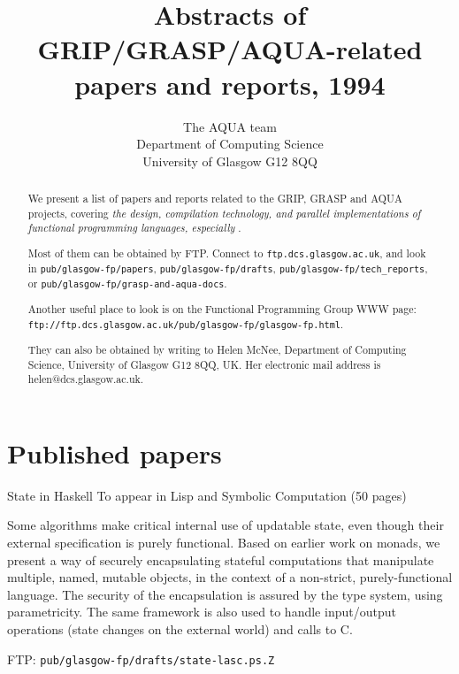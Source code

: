 



\title{Abstracts of GRIP/GRASP/AQUA-related papers and reports, 1994
}

\author{The AQUA team \\ Department of Computing Science \\
University of Glasgow G12 8QQ
}

\maketitle

\begin{abstract}
We present a list of papers and reports related to the GRIP, GRASP and AQUA projects,
covering {\em the design, compilation technology,
and parallel implementations of functional programming languages, especially
\Haskell{}}.

Most of them can be obtained by FTP.  Connect to {\tt ftp.dcs.glasgow.ac.uk},
and look in {\tt pub/glasgow-fp/papers}, {\tt pub/glasgow-fp/drafts}, {\tt pub/glasgow-fp/tech\_reports},
or {\tt pub/glasgow-fp/grasp-and-aqua-docs}.

Another useful place to look is on the Functional Programming Group WWW page:
{\tt ftp://ftp.dcs.glasgow.ac.uk/pub/glasgow-fp/glasgow-fp.html}.

They can also be obtained by writing to 
Helen McNee, Department of Computing Science,
University of Glasgow G12 8QQ, UK.   Her electronic mail address is
helen@dcs.glasgow.ac.uk.
\end{abstract}

\section{Published papers}

{State in Haskell}
{To appear in Lisp and Symbolic Computation (50 pages)}
{
Some algorithms make critical internal use of updatable state, even
though their external specification is purely functional.  Based on
earlier work on monads, we present a way of securely encapsulating
stateful computations that manipulate multiple, named, mutable
objects, in the context of a non-strict, purely-functional language.
The security of the encapsulation is assured by the type system, using
parametricity.  The same framework is also used to handle input/output
operations (state changes on the external world) and calls to C.

FTP: {\tt pub/glasgow-fp/drafts/state-lasc.ps.Z}
}

